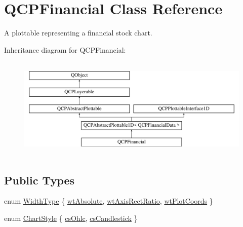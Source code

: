 \hypertarget{class_q_c_p_financial}{}\section{Q\+C\+P\+Financial Class Reference}
\label{class_q_c_p_financial}


A plottable representing a financial stock chart.  


Inheritance diagram for Q\+C\+P\+Financial\+:\begin{figure}[H]
\begin{center}
\leavevmode
\includegraphics[height=4.878048cm]{class_q_c_p_financial}
\end{center}
\end{figure}
\subsection*{Public Types}
\begin{DoxyCompactItemize}
\item 
enum \hyperlink{class_q_c_p_financial_aef1761dda71a53dc5269685e9e492626}{Width\+Type} \{ \hyperlink{class_q_c_p_financial_aef1761dda71a53dc5269685e9e492626a0758d53bb6d7b4858e6bf8771edc934a}{wt\+Absolute}, 
\hyperlink{class_q_c_p_financial_aef1761dda71a53dc5269685e9e492626a806518350ea5814d28c29b0056e33ecd}{wt\+Axis\+Rect\+Ratio}, 
\hyperlink{class_q_c_p_financial_aef1761dda71a53dc5269685e9e492626af676bc8dbe700b96b333329c9dbfc30f}{wt\+Plot\+Coords}
 \}
\item 
enum \hyperlink{class_q_c_p_financial_a0f800e21ee98d646dfc6f8f89d10ebfb}{Chart\+Style} \{ \hyperlink{class_q_c_p_financial_a0f800e21ee98d646dfc6f8f89d10ebfba3a516016c9298d3e95dd82aa203c4390}{cs\+Ohlc}, 
\hyperlink{class_q_c_p_financial_a0f800e21ee98d646dfc6f8f89d10ebfbac803cbd39f26e3f206bcc7028679e62f}{cs\+Candlestick}
 \}
\end{DoxyCompactItemize}
